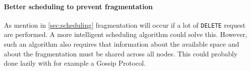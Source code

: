 \documentclass[12pt,a4paper]{scrartcl}
\begin{document}
\paragraph{Better scheduling to prevent fragmentation}
As mention in \autoref{sec:scheduling} fragmentation will occur if a lot of \verb|DELETE| request are performed. A more intelligent scheduling algorithm could solve this. However, such an algorithm also requires that information about the available space and about the fragmentation must be shared across all nodes. This could probably done lazily with for example a Gossip Protocol.





\nocite{*}
\end{document}
